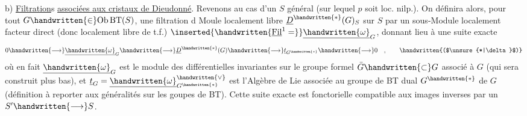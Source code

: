 b) \uline{Filtration}s \uline{associées aux cristaux de Dieudonné}. Revenons au cas d'un $S$ général (sur lequel $p$ soit loc. nilp.). On définira alors, pour tout $G\handwritten{\in}\mathrm{Ob}\,\mathrm{BT}(S)$, une filtration  d Moule localement libre $\underline{D}^{\handwritten{*}}(G)_S$ sur $S$ par un sous-Module localement facteur direct (donc localement libre de t.f.) $\inserted{\handwritten{\underline{\mathrm{Fil}}^1=}}\underline{\handwritten{\omega}}_G$, donnant lieu à une suite exacte
\[
0\handwritten{\longrightarrow}\underline{\handwritten{\omega}}_G\handwritten{\longrightarrow}\underline{D}^{\handwritten{*}}(G)\handwritten{\longrightarrow}\underline{t}_{G^{\handwritten{*}}}\handwritten{\longrightarrow}0\quad,
\tag*{\handwritten{($\unsure{*|\delta}$)}}
\]
où en fait $\underline{\handwritten{\omega}}_G$ est le module des différentielles invariantes sur le groupe formel $\bar{G}\handwritten{\subset}G$ associé à $G$ (qui sera construit plus bas), et $\underline{t}_G=\underline{\handwritten{\omega}}_{G^{\handwritten{*}}}^{\handwritten{\vee}}$ est l'Algèbre de Lie associée au groupe de BT dual $G^{\handwritten{*}}$ de $G$ (définition à reporter aux généralités sur les goupes de BT). Cette  suite exacte est fonctorielle   compatible aux images inverses par un $S'\handwritten{\longrightarrow}S$.

